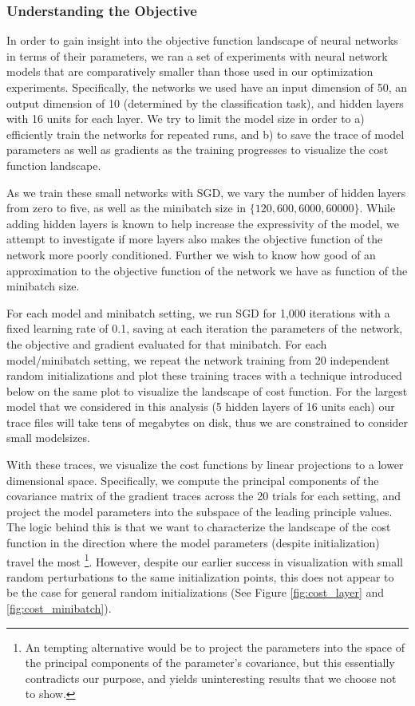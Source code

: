 \subsubsection*{Understanding the Objective}

In order to gain insight into the objective function landscape of neural
networks in terms of their parameters, we ran a set of experiments with neural
network models that are comparatively smaller than those used in our
optimization experiments.  Specifically, the networks we used have an input
dimension of 50, an output dimension of 10 (determined by the classification
task), and hidden layers with 16 units for each layer. We try to limit the
model size in order to a) efficiently train the networks for repeated runs, and
b) to save the trace of model parameters as well as gradients as the training
progresses to visualize the cost function landscape.

As we train these small networks with SGD, we vary the number of hidden layers
from zero to five, as well as the minibatch size in $\{120,600,6000,60000\}$.
While adding hidden layers is known to help increase the expressivity of the
model, we attempt to investigate if more layers also makes the objective
function of the network more poorly conditioned. Further we wish to know how
good of an approximation to the objective function of the network we have as
function of the minibatch size.

For each model and minibatch setting, we run SGD for 1,000 iterations with a
fixed learning rate of 0.1, saving at each iteration the parameters of the
network, the objective and gradient evaluated for that minibatch. For each
model/minibatch setting, we repeat the network training from 20 independent
random initializations and plot these training traces with a technique
introduced below on the same plot to visualize the landscape of cost function.
For the largest model that we considered in this analysis (5 hidden layers of
16 units each) our trace files will take tens of megabytes on disk, thus we are
constrained to consider small modelsizes.

With these traces, we visualize the cost functions by linear projections to a
lower dimensional space. Specifically, we compute the principal components of
the covariance matrix of the gradient traces across the 20 trials for each
setting, and project the model parameters into the subspace of the leading
principle values. The logic behind this is that we want to characterize the
landscape of the cost function in the direction where the model parameters
(despite initialization) travel the most \footnote{An tempting alternative
would be to project the parameters into the space of the principal components
of the parameter's covariance, but this essentially contradicts our purpose,
and yields uninteresting results that we choose not to show.}. However, despite
our earlier success in visualization with small random perturbations to the
same initialization points, this does not appear to be the case for general
random initializations (See Figure \ref{fig:cost_layer} and
\ref{fig:cost_minibatch}).

